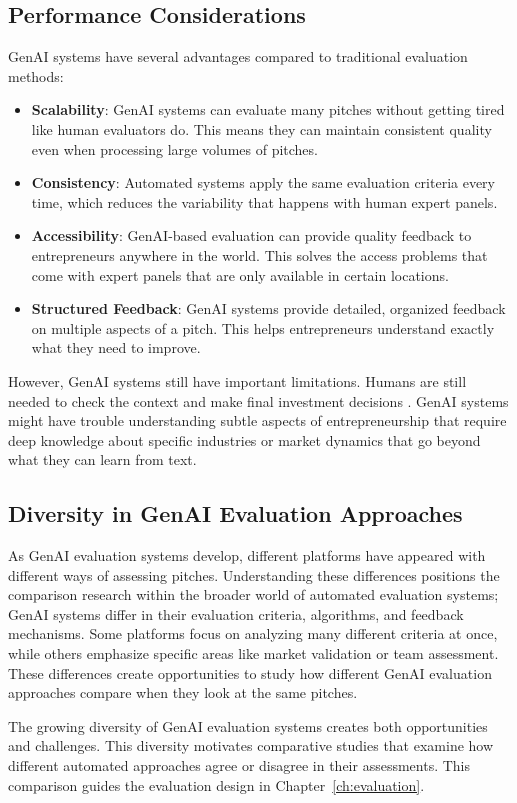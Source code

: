 \subsection{Performance Considerations}\label{subsec:performance-considerations}
GenAI systems have several advantages compared to traditional evaluation methods:

\begin{itemize}
    \item \textbf{Scalability}: GenAI systems can evaluate many pitches without getting tired like human evaluators do. This means they can maintain consistent quality even when processing large volumes of pitches.

    \item \textbf{Consistency}: Automated systems apply the same evaluation criteria every time, which reduces the variability that happens with human expert panels.

    \item \textbf{Accessibility}: GenAI-based evaluation can provide quality feedback to entrepreneurs anywhere in the world. This solves the access problems that come with expert panels that are only available in certain locations.

    \item \textbf{Structured Feedback}: GenAI systems provide detailed, organized feedback on multiple aspects of a pitch. This helps entrepreneurs understand exactly what they need to improve.
\end{itemize}

However, GenAI systems still have important limitations. Humans are still needed to check the context and make final investment decisions \cite{Steyvers2024}. GenAI systems might have trouble understanding subtle aspects of entrepreneurship that require deep knowledge about specific industries or market dynamics that go beyond what they can learn from text.

\clearpage
\subsection{Diversity in GenAI Evaluation Approaches}\label{subsec:GenAI-evaluation-diversity}
As GenAI evaluation systems develop, different platforms have appeared with different ways of assessing pitches. Understanding these differences positions the comparison research within the broader world of automated evaluation systems; GenAI systems differ in their evaluation criteria, algorithms, and feedback mechanisms. Some platforms focus on analyzing many different criteria at once, while others emphasize specific areas like market validation or team assessment. These differences create opportunities to study how different GenAI evaluation approaches compare when they look at the same pitches.

The growing diversity of GenAI evaluation systems creates both opportunities and challenges. This diversity motivates comparative studies that examine how different automated approaches agree or disagree in their assessments. This comparison guides the evaluation design in Chapter~\ref{ch:evaluation}.



